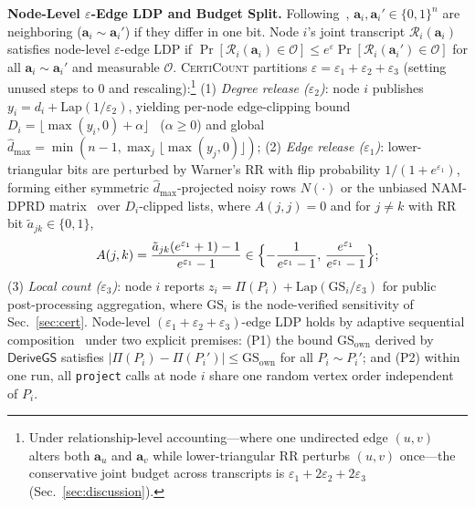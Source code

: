 \documentclass[conference]{IEEEtran}
\newlength{\ieeeindent}
\newcommand{\parhead}[1]{\par\noindent\hspace*{\ieeeindent}\textbf{#1}}
\theoremstyle{ieeeitalic}
\newcommand{\GS}{\mathrm{GS}}
\newcommand{\dhatmax}{\hat{d}_{\max}}
\newcommand{\Lap}{\mathrm{Lap}}
\newcommand{\DeriveGS}{\mathsf{DeriveGS}}
\begin{document}
\parhead{Node-Level $\varepsilon$-Edge LDP and Budget Split.}
Following~\cite{imola2021locally,zhang2026psc}, $\mathbf{a}_i, \mathbf{a}_i' \in \{0,1\}^n$ are neighboring ($\mathbf{a}_i \sim \mathbf{a}_i'$) if they differ in one bit. Node $i$'s joint transcript $\mathcal{R}_i(\mathbf{a}_i)$ satisfies node-level $\varepsilon$-edge LDP if $\Pr[\mathcal{R}_i(\mathbf{a}_i) \in \mathcal{O}] \le e^{\varepsilon}\Pr[\mathcal{R}_i(\mathbf{a}_i') \in \mathcal{O}]$ for all $\mathbf{a}_i \sim \mathbf{a}_i'$ and measurable $\mathcal{O}$. \textsc{CertiCount} partitions $\varepsilon = \varepsilon_1 + \varepsilon_2 + \varepsilon_3$ (setting unused steps to $0$ and rescaling):\footnote{Under relationship-level accounting---where one undirected edge $(u,v)$ alters both $\mathbf{a}_u$ and $\mathbf{a}_v$ while lower-triangular RR perturbs $(u,v)$ once---the conservative joint budget across transcripts is $\varepsilon_1 + 2\varepsilon_2 + 2\varepsilon_3$ (Sec.~\ref{sec:discussion}).}
(1) \emph{Degree release ($\varepsilon_2$)}: node $i$ publishes $y_i = d_i + \Lap(1/\varepsilon_2)$, yielding per-node edge-clipping bound $D_i = \lfloor \max(y_i, 0) + \alpha \rfloor$~\cite{imola2022communication} ($\alpha \ge 0$) and global $\dhatmax = \min(n-1, \max_j \lfloor \max(y_j, 0) \rfloor)$;
(2) \emph{Edge release ($\varepsilon_1$)}: lower-triangular bits are perturbed by Warner's RR with flip probability $1/(1+e^{\varepsilon_1})$, forming either symmetric $\dhatmax$-projected noisy rows $N(\cdot)$ or the unbiased NAM-DPRD matrix~\cite{guo2025nam} over $D_i$-clipped lists, where $A(j,j)=0$ and for $j \neq k$ with RR bit $\tilde{a}_{jk} \in \{0,1\}$,
\begin{equation}
A(j,k) = \frac{\tilde{a}_{jk}(e^{\varepsilon_1}+1)-1}{e^{\varepsilon_1}-1} \in \Bigl\{-\frac{1}{e^{\varepsilon_1}-1},\, \frac{e^{\varepsilon_1}}{e^{\varepsilon_1}-1}\Bigr\};
\label{eq:nam}
\end{equation}
(3) \emph{Local count ($\varepsilon_3$)}: node $i$ reports $z_i = \Pi(P_i) + \Lap(\GS_i/\varepsilon_3)$ for public post-processing aggregation, where $\GS_i$ is the node-verified sensitivity of Sec.~\ref{sec:cert}. Node-level $(\varepsilon_1+\varepsilon_2+\varepsilon_3)$-edge LDP holds by adaptive sequential composition~\cite{dwork2014algorithmic} under two explicit premises: (P1) the bound $\GS_{\mathrm{own}}$ derived by $\DeriveGS$ satisfies $|\Pi(P_i)-\Pi(P_i')| \le \GS_{\mathrm{own}}$ for all $P_i \sim P_i'$; and (P2) within one run, all \texttt{project} calls at node $i$ share one random vertex order independent of $P_i$.
\end{document}
